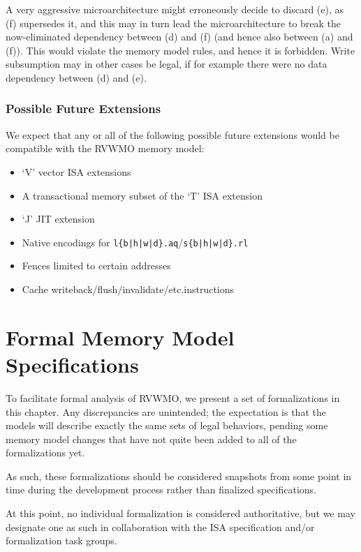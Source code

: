 A very aggressive microarchitecture might erroneously decide to discard (e), as (f) supersedes it, and this may in turn lead the microarchitecture to break the now-eliminated dependency between (d) and (f) (and hence also between (a) and (f)).
This would violate the memory model rules, and hence it is forbidden.
Write subsumption may in other cases be legal, if for example there were no data dependency between (d) and (e).

\subsection{Possible Future Extensions}

We expect that any or all of the following possible future extensions would be compatible with the RVWMO memory model:

\begin{itemize}
  \item `V' vector ISA extensions
  \item A transactional memory subset of the `T' ISA extension
  \item `J' JIT extension
  \item Native encodings for {\tt l\{b|h|w|d\}.aq}/{\tt s\{b|h|w|d\}.rl}
  \item Fences limited to certain addresses
  \item Cache writeback/flush/invalidate/etc.\@ instructions
\end{itemize}

\chapter{Formal Memory Model Specifications}

\begin{commentary}
  To facilitate formal analysis of RVWMO, we present a set of formalizations in this chapter.  Any discrepancies are unintended; the expectation is that the models will describe exactly the same sets of legal behaviors, pending some memory model changes that have not quite been added to all of the formalizations yet.

  As such, these formalizations should be considered snapshots from some point in time during the development process rather than finalized specifications.

  At this point, no individual formalization is considered authoritative, but we may designate one as such in collaboration with the ISA specification and/or formalization task groups.
\end{commentary}

